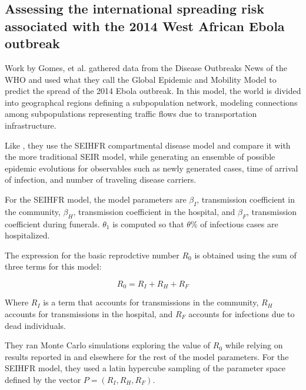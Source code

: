 \documentclass[10pt, journal,onecolumn]{IEEEtran}
\begin{document}
\subsection{\textbf{Assessing the international spreading risk associated with the 2014 West African Ebola outbreak \citep{gomes2014assessing} }}

Work by Gomes, et al. \citep{gomes2014assessing} gathered data from the Disease Outbreaks News of
the WHO and used what they call the Global Epidemic and Mobility Model to predict the spread of the
2014 Ebola outbreak. In this model, the world is divided into geographcal regions defining a
subpopulation network, modeling connections among subpopulations representing traffic flows due to
transportation infrastructure.

Like \citep{legrand2007understanding}, they use the SEIHFR compartmental disease model and compare
it with the more traditional SEIR model, while
generating an ensemble of possible epidemic evolutions for observables such as newly generated
cases, time of arrival of infection, and number of traveling disease carriers.

For the SEIHFR model, the model parameters are $\beta_I$, transmission coefficient in the
community, $\beta_H$, transmission coefficient in the hospital, and $\beta_F$, transmission
coefficient during funerals. $\theta_1$ is computed so that $\theta\%$ of infectious cases
are hospitalized.

The expression for the basic reprodctive number $R_0$ is obtained using the sum of three terms
for this model:

$$
R_0 = R_I + R_H + R_F
$$

Where $R_I$ is a term that accounts for transmissions in the community, $R_H$ accounts for
transmissions in the hospital, and $R_F$ accounts for infections due to dead individuals.

They ran Monte Carlo simulations exploring the value of $R_0$ while relying on results reported
in \citep{legrand2007understanding} and elsewhere for the rest of the model parameters.
For the SEIHFR model, they used a latin hypercube sampling of the parameter space defined by the
vector $P = (R_I, R_H, R_F)$.
\end{document}
